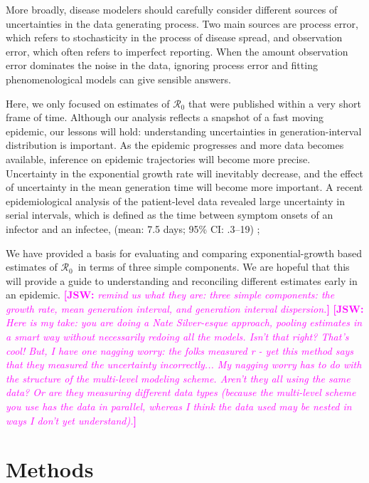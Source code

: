 \documentclass[12pt]{article}
\newcommand{\Rx}[1]{\ensuremath{{\mathcal R}_{#1}}}
\newcommand{\Ro}{\Rx{0}\xspace}
\newcommand{\comment}[3]{\textcolor{#1}{\textbf{[#2: }\textsl{#3}\textbf{]}}}
\newcommand{\jsw}[1]{\comment{magenta}{JSW}{#1}}
\begin{document}
More broadly, disease modelers should carefully consider different sources of uncertainties in the data generating process.
Two main sources are process error, which refers to stochasticity in the process of disease spread, and observation error, which often refers to imperfect reporting.
When the amount observation error dominates the noise in the data, ignoring process error and fitting phenomenological models can give sensible answers.

Here, we only focused on estimates of \Ro that were published within a very short frame of time.
Although our analysis reflects a snapshot of a fast moving epidemic, our lessons will hold: understanding uncertainties in generation-interval distribution is important.
As the epidemic progresses and more data becomes available, inference on epidemic trajectories will become more precise.
Uncertainty in the exponential growth rate will inevitably decrease, 
and the effect of uncertainty in the mean generation time will become more important.
A recent epidemiological analysis of the patient-level data revealed large uncertainty in serial intervals, which is defined as the time between symptom onsets of an infector and an infectee, (mean: 7.5 days; 95\% CI: .3--19) \citep{nejmncov};



We have provided a basis for evaluating and comparing exponential-growth based estimates of \Ro\ in terms of three simple components. We are hopeful that this will provide a guide to understanding and reconciling different estimates early in an epidemic.
\jsw{remind us what they are: 
three simple components: the growth rate, mean generation interval, and generation interval dispersion.}
\jsw{Here is my take: you are doing a Nate Silver-esque approach, pooling estimates in a smart way without necessarily redoing all the models. Isn't that right? That's cool!  
But, I have one nagging worry: the folks measured r - yet this method says that they measured the uncertainty incorrectly... My nagging worry has to do with the structure of the multi-level modeling scheme. Aren't they all using the same data? Or are they measuring different data types (because the multi-level scheme you use has the data in parallel, whereas I think the data used may be nested in ways I don't yet understand).}

\section{Methods}
\end{document}
